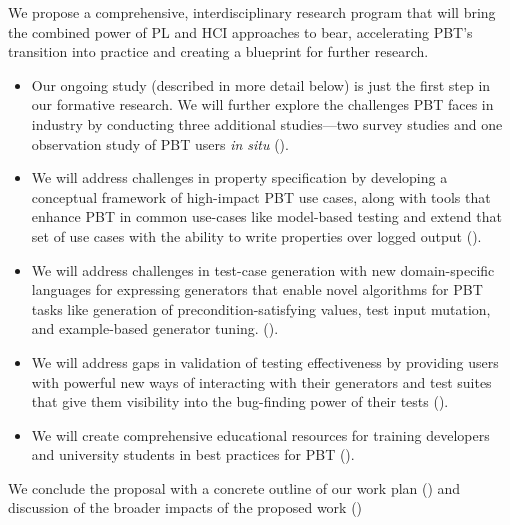 We propose a comprehensive, interdisciplinary research program that
will bring the combined power of PL and HCI approaches to bear,
accelerating PBT's transition into practice\iflater{} and creating a blueprint for further research\fi.
\iflater{}\fi
\begin{itemize}[noitemsep]
  \item
  Our ongoing study (described in more detail below) is
  just the first step in our formative research.
  We will further explore the challenges PBT faces in
  industry by conducting three additional
  studies---two survey studies and one observation study of
  PBT users {\em in situ} ().
  \item We will address challenges in property specification by developing a
  conceptual framework of high-impact PBT use cases, along with tools that
  enhance PBT in common use-cases like model-based testing and extend that set
  of use cases with the ability to write properties over logged output
  ().
  \item We will address challenges in test-case generation with new
  domain-specific languages for expressing generators that enable novel
  algorithms for PBT tasks like generation of precondition-satisfying values,
  test input mutation, and example-based generator tuning.
  ().
  \item We will address gaps in validation of testing effectiveness by providing
  users with powerful new ways of interacting with their generators and test
  suites that give them visibility into the bug-finding power of their tests
  ().
  \item We will create comprehensive educational resources for training developers and
  university students in best practices for PBT ().
\end{itemize}
We conclude the proposal with a concrete outline of our work plan
() and discussion of the broader impacts of the
proposed work ()


